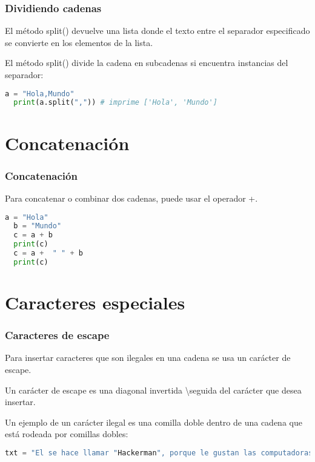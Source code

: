 \begin{frame}[fragile]
  \frametitle{Dividiendo cadenas}

  El método \textcolor{codeKeyword}{split}() devuelve una lista donde
  el texto entre el separador especificado se convierte en los elementos
  de la lista.

  \vspace{\baselineskip}
  El método \textcolor{codeKeyword}{split}() divide la cadena en
  subcadenas si encuentra instancias del separador:
  \begin{lstlisting}[language=Python]
  a = "Hola,Mundo"
  print(a.split(",")) # imprime ['Hola', 'Mundo']
  \end{lstlisting}
\end{frame}


\section{Concatenación}

\begin{frame}[fragile]
  \frametitle{Concatenación}

  Para concatenar o combinar dos cadenas, puede usar el operador +.

  \begin{lstlisting}[language=Python]
  a = "Hola"
  b = "Mundo"
  c = a + b
  print(c)
  c = a +  " " + b
  print(c)
  \end{lstlisting}
\end{frame}


\section{Caracteres especiales}

\begin{frame}[fragile]
  \frametitle{Caracteres de escape}

  Para insertar caracteres que son ilegales en una cadena se
  usa un carácter de escape.

  \vspace{\baselineskip}
  Un carácter de escape es una diagonal invertida \textbackslash  seguida del
  carácter que desea insertar.

  \vspace{\baselineskip}
  Un ejemplo de un carácter ilegal es una comilla doble dentro
  de una cadena que está rodeada por comillas dobles: 

  \vspace{\baselineskip}
  \begin{lstlisting}[language=Python]
  txt = "El se hace llamar "Hackerman", porque le gustan las computadoras"
  \end{lstlisting}
\end{frame}

